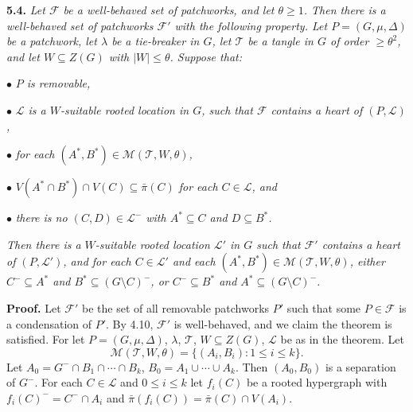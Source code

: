 \textbf{5.4.} \textit{Let $\mathcal{F}$ be a well-behaved set of patchworks, and let $\theta \ge 1$. Then there is a well-behaved set of patchworks $\mathcal{F}'$ with the following property. Let $P = (G, \mu, \Delta)$ be a patchwork, let $\lambda$ be a tie-breaker in $G$, let $\mathcal{T}$ be a tangle in $G$ of order $\ge \theta^2$, and let $W \subseteq Z(G)$ with $|W| \le \theta$. Suppose that:}

\hspace*{12pt}$\bullet$ \textit{$P$ is removable,}

\hspace*{12pt}$\bullet$ \textit{$\mathcal{L}$ is a $W$-suitable rooted location in $G$, such that $\mathcal{F}$ contains a heart of $(P, \mathcal{L})$,}

\hspace*{12pt}$\bullet$ \textit{for each $(A^*, B^*) \in \mathcal{M}(\mathcal{T}, W, \theta)$,}

\hspace*{12pt}$\bullet$ \textit{$V(A^* \cap B^*) \cap V(C) \subseteq \bar{\pi}(C)$ for each $C \in \mathcal{L}$, and}

\hspace*{12pt}$\bullet$ \textit{there is no $(C, D) \in \mathcal{L}^-$ with $A^* \subseteq C$ and $D \subseteq B^*$.}

\textit{Then there is a $W$-suitable rooted location $\mathcal{L}'$ in $G$ such that $\mathcal{F}'$ contains a heart of $(P, \mathcal{L}')$, and for each $C \in \mathcal{L}'$ and each $(A^*, B^*) \in \mathcal{M}(\mathcal{T}, W, \theta)$, either $C^- \subseteq A^*$ and $B^* \subseteq (G \setminus C)^-$, or $C^- \subseteq B^*$ and $A^* \subseteq (G \setminus C)^-$.}

\textbf{Proof.} Let $\mathcal{F}'$ be the set of all removable patchworks $P'$ such that some $P \in \mathcal{F}$ is a condensation of $P'$. By 4.10, $\mathcal{F}'$ is well-behaved, and we claim the theorem is satisfied. For let $P = (G, \mu, \Delta)$, $\lambda$, $\mathcal{T}$, $W \subseteq Z(G)$, $\mathcal{L}$ be as in the theorem. Let
\begin{equation*}
\mathcal{M}(\mathcal{T}, W, \theta) = \{(A_i, B_i) : 1 \le i \le k\}.
\end{equation*}
Let $A_0 = G^- \cap B_1 \cap \cdots \cap B_k$, $B_0 = A_1 \cup \cdots \cup A_k$. Then $(A_0, B_0)$ is a separation of $G^-$. For each $C \in \mathcal{L}$ and $0 \le i \le k$ let $f_i(C)$ be a rooted hypergraph with $f_i(C)^- = C^- \cap A_i$ and $\bar{\pi}(f_i(C)) = \bar{\pi}(C) \cap V(A_i)$.

